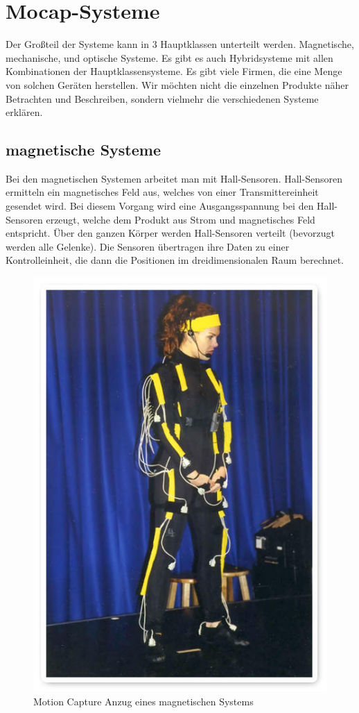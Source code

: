 \chapter{Mocap-Systeme}

Der Großteil der Systeme kann in 3 Hauptklassen unterteilt werden. Magnetische, mechanische,
und optische Systeme. Es gibt es auch Hybridsysteme mit allen  
Kombinationen der Hauptklassensysteme. Es gibt viele Firmen, die eine Menge von solchen Geräten 
herstellen. Wir möchten nicht die einzelnen Produkte näher Betrachten und Beschreiben, sondern vielmehr die 
verschiedenen Systeme erklären.

\section{magnetische Systeme}

Bei den magnetischen Systemen arbeitet man mit Hall-Sensoren. Hall-Sensoren ermitteln ein magnetisches Feld aus, welches von einer Transmittereinheit gesendet wird. Bei diesem  Vorgang wird eine Ausgangsspannung bei den Hall-Sensoren erzeugt, welche dem Produkt aus Strom und magnetisches Feld entspricht. Über den ganzen Körper werden Hall-Sensoren verteilt (bevorzugt werden alle Gelenke). Die 
Sensoren übertragen ihre Daten zu einer Kontrolleinheit, die dann die Positionen im dreidimensionalen Raum berechnet.

\begin{figure}[htbp]
\centering
\includegraphics[scale=1.4]{include/magneticgirl.jpg}
\caption{Motion Capture Anzug eines magnetischen  Systems}
\end{figure}

